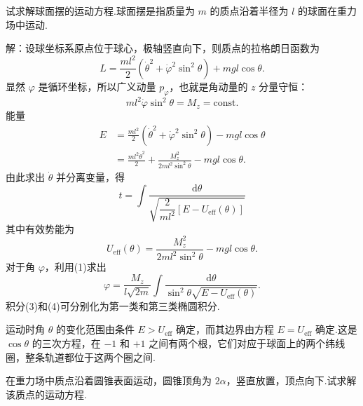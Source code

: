 \begin{xiti}

\quad 试求解球面摆的运动方程.球面摆是指质量为 $m$ 的质点沿着半径为 $l$ 的球面在重力场中运动.

解：设球坐标系原点位于球心，极轴竖直向下，则质点的拉格朗日函数为
\begin{equation*}
  L=\frac{ml^2}{2}\left(\dot{\theta}^2
  +\dot{\varphi}^2\sin^2\theta\right)
  +mgl\cos\theta.
\end{equation*}
显然 $\varphi$ 是循环坐标，所以广义动量 $p_{\varphi}$，也就是角动量的 $z$ 分量守恒：
\begin{equation*}
  ml^2\dot{\varphi}\sin^2\theta=M_z=\mathrm{const}.
\tag{1}
\end{equation*}
能量
\begin{equation*}
\begin{aligned}
  E&=\frac{ml^2}{2}\left(\dot{\theta}^2
  +\dot{\varphi}^2\sin^2\theta\right)-mgl\cos\theta\\
  &=\frac{ml^2\dot{\theta}^2}{2}
  +\frac{M_z^2}{2ml^2\sin^2\theta}
  -mgl\cos\theta.
\end{aligned}
\tag{2}
\end{equation*}
由此求出 $\dot{\theta}$ 并分离变量，得
\begin{equation*}
  t=\int\frac{\mathrm{d}\theta}
  {\sqrt{\dfrac{2}{ml^2}\left[E-U_{\mathrm{eff}}(\theta)\right]}}
\tag{3}
\end{equation*}
其中有效势能为
\begin{equation*}
  U_{\mathrm{eff}}(\theta)=\frac{M_z^2}{2ml^2\sin^2\theta}
  -mgl\cos\theta.
\end{equation*}
对于角 $\varphi$，利用(1)求出
\begin{equation*}
  \varphi=\frac{M_z}{l\sqrt{2m}}
  \int\frac{\mathrm{d}\theta}
  {\sin^2\theta\sqrt{E-U_{\mathrm{eff}}(\theta)}}.
\tag{4}
\end{equation*}
积分(3)和(4)可分别化为第一类和第三类椭圆积分.

运动时角 $\theta$ 的变化范围由条件 $E>U_{\mathrm{eff}}$ 确定，而其边界由方程 $E=U_{\mathrm{eff}}$ 确定.这是 $\cos\theta$ 的三次方程，在 $-1$ 和 $+1$ 之间有两个根，它们对应于球面上的两个纬线圈，整条轨道都位于这两个圈之间.

\quad 在重力场中质点沿着圆锥表面运动，圆锥顶角为 $2\alpha$，竖直放置，顶点向下.试求解该质点的运动方程.


\end{xiti}
